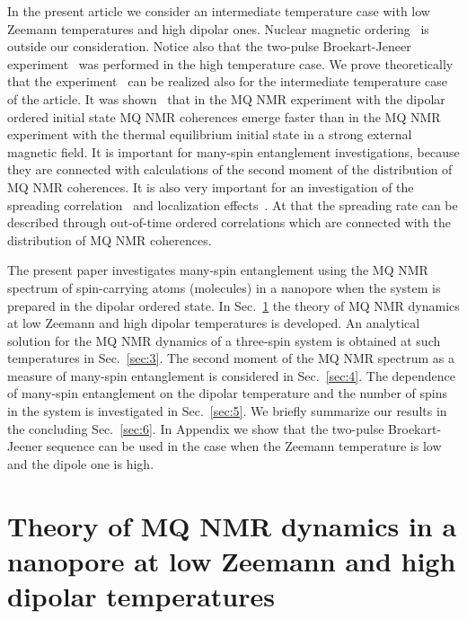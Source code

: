 \documentclass[review]{elsarticle}
\begin{document}
In the present article we consider an intermediate temperature case with low Zeemann temperatures and high dipolar ones. 
Nuclear magnetic ordering~\cite{Abragam_1982} is outside our consideration.
Notice also that the two-pulse Broekart-Jeneer experiment~\cite{Jeener_1967} was performed in the high temperature case.
We prove theoretically that the experiment~\cite{Jeener_1967} can be realized also for the intermediate temperature case of the article. 
It was shown~\cite{Doronin_2011} that in the MQ NMR experiment with the dipolar ordered initial state MQ NMR coherences emerge faster 
than in the MQ NMR experiment with the thermal equilibrium initial state in a strong external magnetic field.
It is important for many-spin entanglement investigations, because they are connected with calculations of the second moment of the distribution of MQ NMR coherences. 
It is also very important for an investigation of the spreading correlation~\cite{Baugh_2001,Baum_1986,S_nchez_2014,Munowitz_1987} and localization effects~\cite{Alvarez_2015,Wei_2018}.
At that the spreading rate can be described through out-of-time ordered correlations which are connected with the distribution of MQ NMR coherences. 

The present paper investigates many-spin entanglement using the MQ NMR spectrum of spin-carrying atoms (molecules) in a nanopore when the system is prepared in the dipolar ordered state.
In Sec.~\ref{sec:2} the theory of MQ NMR dynamics at low Zeemann and high dipolar temperatures is developed.
An analytical solution for the MQ NMR dynamics of a three-spin system is obtained at such temperatures in Sec.~\ref{sec:3}.
The second moment of the MQ NMR spectrum as a measure of many-spin entanglement is considered in Sec.~\ref{sec:4}.
The dependence of many-spin entanglement on the dipolar temperature and the number of spins in the system is investigated in Sec.~\ref{sec:5}.
We briefly summarize our results in the concluding Sec.~\ref{sec:6}.
In Appendix we show that the two-pulse Broekart-Jeener sequence can be used in the case when the Zeemann temperature is low and the dipole one is high.



\section{Theory of MQ NMR dynamics in a nanopore at low Zeemann and high dipolar temperatures}
\label{sec:2}
\end{document}
